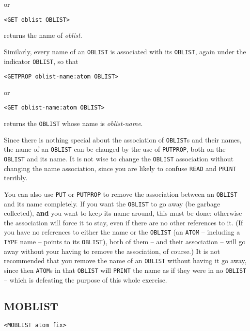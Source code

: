 \documentclass[a4paper]{scrbook}
\begin{document}
or

\begin{verbatim}
<GET oblist OBLIST>
\end{verbatim}

returns the name of \emph{oblist}.

Similarly, every name of an \texttt{OBLIST} is associated with its \texttt{OBLIST}, again under the indicator
\texttt{OBLIST}, so that

\begin{verbatim}
<GETPROP oblist-name:atom OBLIST>
\end{verbatim}

or

\begin{verbatim}
<GET oblist-name:atom OBLIST>
\end{verbatim}

returns the \texttt{OBLIST} whose name is \emph{oblist-name}.

Since there is nothing special about the association of \texttt{OBLIST}s and their names, the name of an \texttt{OBLIST}
can be changed by the use of \texttt{PUTPROP}, both on the \texttt{OBLIST} and its name. It is not wise to change the
\texttt{OBLIST} association without changing the name association, since you are likely to confuse \texttt{READ} and
\texttt{PRINT} terribly.

You can also use \texttt{PUT} or \texttt{PUTPROP} to remove the association between an \texttt{OBLIST} and its name
completely. If you want the \texttt{OBLIST} to go away (be garbage collected), \textbf{and} you want to keep its name
around, this must be done: otherwise the association will force it to stay, even if there are no other references to it.
(If you have no references to either the name or the \texttt{OBLIST} (an \texttt{ATOM} -- including a \texttt{TYPE} name --
points to its \texttt{OBLIST}), both of them -- and their association -- will go away without your having to remove the
association, of course.) It is not recommended that you remove the name of an \texttt{OBLIST} without having it go away,
since then \texttt{ATOM}s in that \texttt{OBLIST} will \texttt{PRINT} the name as if they were in no \texttt{OBLIST} --
which is defeating the purpose of this whole exercise.

\subsection{MOBLIST}\label{moblist}

\begin{verbatim}
<MOBLIST atom fix>
\end{verbatim}
\end{document}
